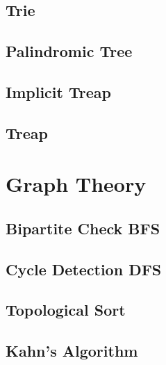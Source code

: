 \documentclass[10pt]{article}
\begin{document}
\begin{multicols*}{2}
\subsection{Trie}


\subsection{Palindromic Tree}


\subsection{Implicit Treap}


\subsection{Treap}



\section{Graph Theory}

\subsection{Bipartite Check BFS}


\subsection{Cycle Detection DFS}


\subsection{Topological Sort}


\subsection{Kahn's Algorithm}



\end{multicols*}
\end{document}
